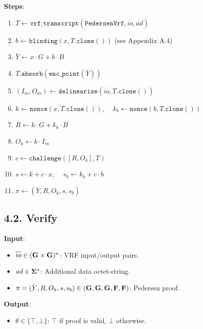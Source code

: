 \documentclass[
]{article}
\providecommand{\tightlist}{%
  \setlength{\itemsep}{0pt}\setlength{\parskip}{0pt}}
\begin{document}
\textbf{Steps}:

\begin{enumerate}
\def\labelenumi{\arabic{enumi}.}
\tightlist
\item
  \(T \gets \texttt{vrf\_transcript}(\texttt{PedersenVrf}, \overline{io}, ad)\)
\item
  \(b \gets \texttt{blinding}(x, T.\texttt{clone}())\) (see Appendix
  A.4)
\item
  \(\bar{Y} \gets x \cdot G + b \cdot B\)
\item
  \(T.\texttt{absorb}(\texttt{enc\_point}(\bar{Y}))\)
\item
  \((I_m, O_m) \gets \texttt{delinearize}(\overline{io}, T.\texttt{clone}())\)
\item
  \(k \gets \texttt{nonce}(x, T.\texttt{clone}())\),
  \(\quad k_b \gets \texttt{nonce}(b, T.\texttt{clone}())\)
\item
  \(R \gets k \cdot G + k_b \cdot B\)
\item
  \(O_k \gets k \cdot I_m\)
\item
  \(c \gets \texttt{challenge}([R, O_k], T)\)
\item
  \(s \gets k + c \cdot x\), \(\quad s_b \gets k_b + c \cdot b\)
\item
  \(\pi \gets (\bar{Y}, R, O_k, s, s_b)\)
\end{enumerate}

\subsection{4.2. Verify}\label{verify-2}

\textbf{Input}:

\begin{itemize}
\tightlist
\item
  \(\overline{io} \in (\bold{G}\times \bold{G})^n\): VRF input/output
  pairs.
\item
  \(ad \in \bold{\Sigma}^*\): Additional data octet-string.
\item
  \(\pi = (\bar{Y}, R, O_k, s, s_b) \in (\bold{G}, \bold{G}, \bold{G}, \bold{F}, \bold{F})\):
  Pedersen proof.
\end{itemize}

\textbf{Output}:

\begin{itemize}
\tightlist
\item
  \(\theta \in \{ \top, \bot \}\): \(\top\) if proof is valid, \(\bot\)
  otherwise.
\end{itemize}
\end{document}
